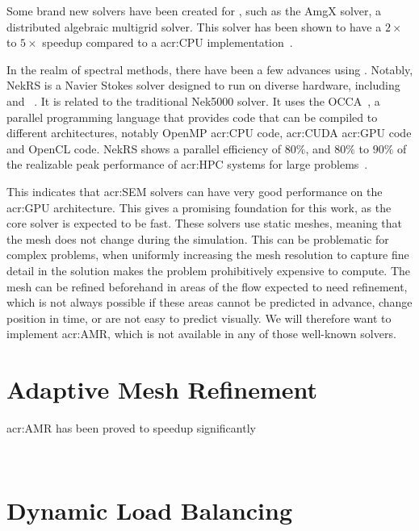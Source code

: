 Some brand new solvers have been created for , such as the AmgX solver, a
distributed algebraic multigrid solver. This solver has been shown to have a \(2 \times \) to \(5
\times \) speedup compared to a \acrshort{acr:CPU} implementation~\cite{Naumov2015}.

In the realm of spectral methods, there have been a few advances using .
Notably, NekRS is a Navier Stokes solver designed to run on diverse hardware, including
 and ~\cite{Fischer2021}. It is related to the traditional
Nek5000 solver. It uses the OCCA~\cite{Medina2014}, a parallel programming language that provides
code that can be compiled to different architectures, notably OpenMP \acrshort{acr:CPU} code,
\acrshort{acr:CUDA} \acrshort{acr:GPU} code and OpenCL code. NekRS shows a parallel efficiency of
\(80 \% \), and \(80 \% \) to \(90 \% \) of the realizable peak performance of \acrshort{acr:HPC}
systems for large problems~\cite{Fischer2021}.

This indicates that \acrshort{acr:SEM} solvers can have very good performance on the
\acrshort{acr:GPU} architecture. This gives a promising foundation for this work, as the core solver
is expected to be fast. These solvers use static meshes, meaning that the mesh does not change
during the simulation. This can be problematic for complex problems, when uniformly increasing the
mesh resolution to capture fine detail in the solution makes the problem prohibitively expensive to
compute. The mesh can be refined beforehand in areas of the flow expected to need refinement, which
is not always possible if these areas cannot be predicted in advance, change position in time, or
are not easy to predict visually. We will therefore want to implement \acrlong{acr:AMR}, which is
not available in any of those well-known solvers.

\section{Adaptive Mesh Refinement}\label{section:literature_review:amr}

\Acrshort{acr:AMR} has been proved to speedup significantly 


~\cite{Schive2018} %

\section{Dynamic Load Balancing}\label{section:literature_review:load_balancing}